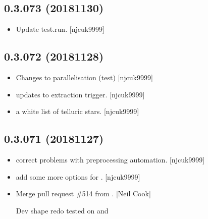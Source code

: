 \documentclass[a4paper,10pt,english]{report}
\begin{document}
\subsection{0.3.073 (2018\sphinxhyphen{}11\sphinxhyphen{}30)}
\label{\detokenize{misc/changelog:id268}}\begin{itemize}
\item {} 
Update test.run. {[}njcuk9999{]}

\end{itemize}


\subsection{0.3.072 (2018\sphinxhyphen{}11\sphinxhyphen{}28)}
\label{\detokenize{misc/changelog:id269}}\begin{itemize}
\item {} 
Changes to parallelisation (test) {[}njcuk9999{]}

\item {} 
 \sphinxhyphen{} updates to extraction trigger. {[}njcuk9999{]}

\item {} 
 \sphinxhyphen{} a white list of telluric stars. {[}njcuk9999{]}

\end{itemize}


\subsection{0.3.071 (2018\sphinxhyphen{}11\sphinxhyphen{}27)}
\label{\detokenize{misc/changelog:id270}}\begin{itemize}
\item {} 
 \sphinxhyphen{} correct problems with pre\sphinxhyphen{}processing automation.
{[}njcuk9999{]}

\item {} 
 \sphinxhyphen{} add some more options for .
{[}njcuk9999{]}

\item {} 
Merge pull request \#514 from . {[}Neil Cook{]}

Dev shape redo \sphinxhyphen{} tested on  and 

\end{itemize}
\end{document}
